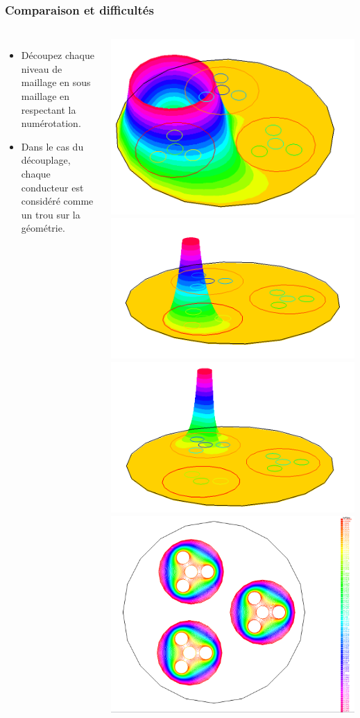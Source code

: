 \begin{frame}
  \frametitle{Comparaison et difficultés}
  \begin{columns}[T]
  \begin{itemize}
      \item Découpez chaque niveau de maillage en sous maillage en respectant la numérotation.
      \item Dans le cas du découplage, chaque conducteur est considéré comme un trou sur la
          géométrie.
  \end{itemize}
  \includegraphics[width=.5\linewidth]{figures/gui/sol3Dfull2-1.png}
  \includegraphics[width=.5\linewidth]{figures/gui/sol3Dfull2-2.png}\\
  \includegraphics[width=.5\linewidth]{figures/gui/sol3Dfull2-3.png}
  \includegraphics[width=.5\linewidth]{figures/gui/sol3Dfull2-4.png}
  \end{columns}
\end{frame}
